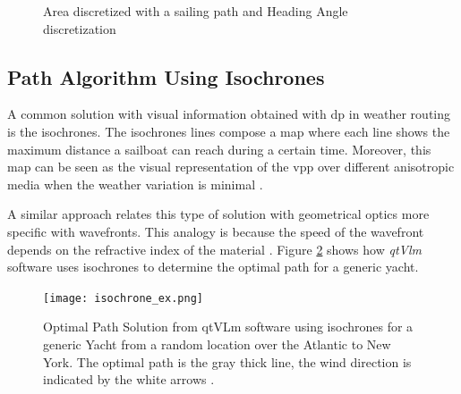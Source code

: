 
\begin{figure} [hbt!]
  \centering
  \hfill 
  \hfill
  \caption{Area discretized with a sailing path and Heading Angle discretization}
\label{fig:AreaDiscret} 
\end{figure}

\subsection{Path Algorithm Using Isochrones} \label{sec:isochrones}
A common solution with visual information obtained with \acrshort{dp} in weather routing is the isochrones. The isochrones lines compose a map where each line shows the maximum distance a sailboat can reach during a certain time. Moreover, this map can be seen as the visual representation of the \acrshort{vpp} over different anisotropic media when the weather variation is minimal \cite{allsopp1998stochastic}. \par 
A similar approach relates this type of solution with geometrical optics more specific with wavefronts. This analogy is because the speed of the wavefront depends on the refractive index of the material \cite{rabaudoptimal}. Figure \ref{fig:isochrone_ex} shows how \textit{qtVlm} software uses isochrones to determine the optimal path for a generic yacht.\par

\begin{figure}[hbt!]
    \centering
    \texttt{[image: isochrone\_ex.png]}
    \caption{Optimal Path Solution from qtVLm software using isochrones for a generic Yacht from a random location over the Atlantic to New York. The optimal path is the gray thick line, the wind direction is indicated by the white arrows \cite{rabaudoptimal}. }
    \label{fig:isochrone_ex}
\end{figure}

